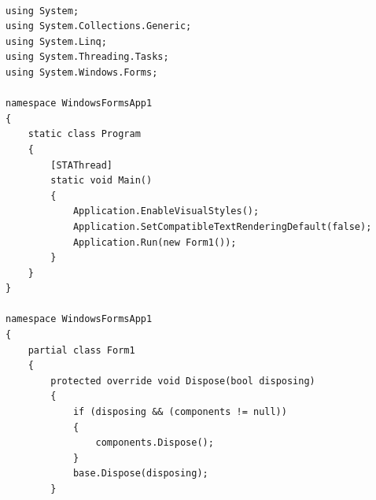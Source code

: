 \documentclass[a4paper]{article}
\begin{document}
\begin{verbatim}

using System;
using System.Collections.Generic;
using System.Linq;
using System.Threading.Tasks;
using System.Windows.Forms;

namespace WindowsFormsApp1
{
    static class Program
    {
        [STAThread]
        static void Main()
        {
            Application.EnableVisualStyles();
            Application.SetCompatibleTextRenderingDefault(false);
            Application.Run(new Form1());
        }
    }
}

namespace WindowsFormsApp1
{
    partial class Form1
    {
        protected override void Dispose(bool disposing)
        {
            if (disposing && (components != null))
            {
                components.Dispose();
            }
            base.Dispose(disposing);
        }


\end{verbatim}
\end{document}
